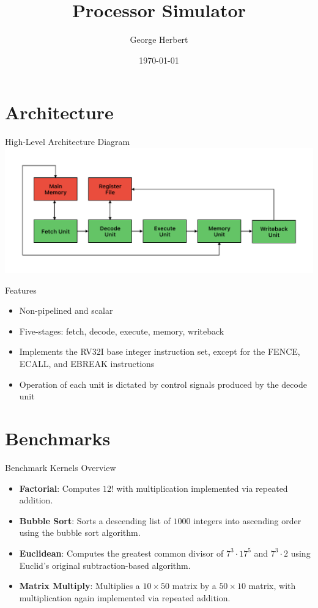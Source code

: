 \documentclass{beamer}
\title{Processor Simulator}
\author{George Herbert}
\date{\today}
\begin{document}
\begin{frame}
    \titlepage
\end{frame}

\section{Architecture}
\begin{frame}{High-Level Architecture Diagram}
    \includegraphics[width = \textwidth]{architecture.pdf}
\end{frame}

\begin{frame}{Features}
    \begin{itemize}
        \item Non-pipelined and scalar
        \item Five-stages: fetch, decode, execute, memory, writeback
        \item Implements the RV32I base integer instruction set, except for the FENCE, ECALL, and EBREAK instructions
        \item Operation of each unit is dictated by control signals produced by the decode unit
    \end{itemize}
\end{frame}

\section{Benchmarks}
\begin{frame}{Benchmark Kernels Overview}
    \begin{itemize}
        \item\textbf{Factorial}: Computes $12!$ with multiplication implemented via repeated addition.
        \item\textbf{Bubble Sort}: Sorts a descending list of $1000$ integers into ascending order using the bubble sort algorithm.
        \item\textbf{Euclidean}: Computes the greatest common divisor of $7^3\cdot17^5$ and $7^3\cdot2$ using Euclid's original subtraction-based algorithm.
        \item\textbf{Matrix Multiply}: Multiplies a $10\times50$ matrix by a $50\times10$ matrix, with multiplication again implemented via repeated addition.
    \end{itemize}
\end{frame}
\end{document}
